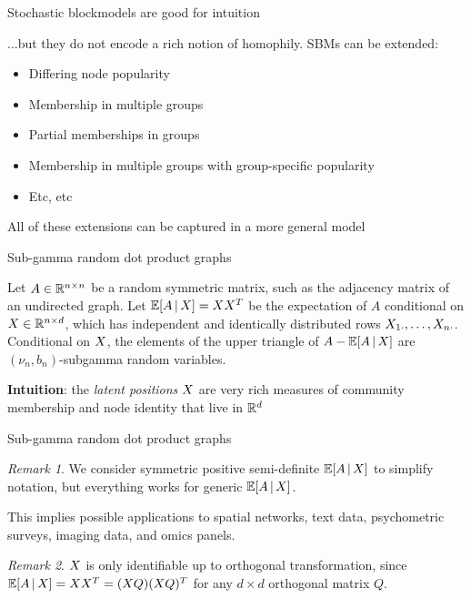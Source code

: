 \documentclass{beamer}
\theoremstyle{remark}
\newtheorem*{remark}{Remark}
\begin{document}
\begin{frame}{Stochastic blockmodels are good for intuition}

    ...but they do not encode a rich notion of homophily. SBMs can be extended:

    \begin{itemize}
        \item Differing node popularity
        \item Membership in multiple groups
        \item Partial memberships in groups
        \item Membership in multiple groups with group-specific popularity
        \item Etc, etc
    \end{itemize}

    All of these extensions can be captured in a more general model

\end{frame}

\begin{frame}{Sub-gamma random dot product graphs}

    \begin{definition}

        Let $A \in \mathbb{R}^{n \times n}$ be a random symmetric matrix, such as the adjacency matrix of an undirected graph. Let $\E[\X]{A} = \X \X^T$ be the expectation of $A$ conditional on $X \in \mathbb{R}^{n \times d}$, which has independent and identically distributed rows $X_{1 \cdot}, \dots, X_{n \cdot}$. Conditional on $X$, the elements of the upper triangle of $A - \E[\X]{A}$ are $(\nu_n, b_n)$-subgamma random variables.

    \end{definition}

    \textbf{Intuition}: the \emph{latent positions} $X$ are very rich measures of community membership and node identity that live in $\mathbb{R}^d$

\end{frame}

\begin{frame}{Sub-gamma random dot product graphs}

    \begin{remark}
        We consider symmetric positive semi-definite $\E[\X]{A}$ to simplify notation, but everything works for generic $\E[\X]{A}$.

        This implies possible applications to spatial networks, text data, psychometric surveys, imaging data, and omics panels.
    \end{remark}

    \begin{remark}
        $X$ is only identifiable up to orthogonal transformation, since $\E[\X]{A} = \X \X^T = (\X Q) (\X Q)^T$ for any $d \times d$ orthogonal matrix $Q$.
    \end{remark}

\end{frame}
\end{document}
